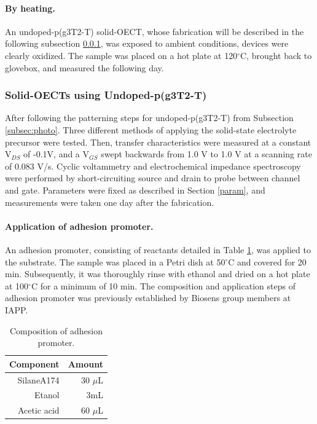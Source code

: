 \paragraph{By heating.}An undoped-p(g3T2-T) solid-OECT, whose fabrication will be described in the following subsection \ref{subsec:solidOECT}, was exposed to ambient conditions, devices were clearly oxidized. The sample was placed on a hot plate at 120$^{\circ}$C, brought back to glovebox, and measured the following day.  %
\subsubsection{Solid-OECTs using Undoped-p(g3T2-T)} \label{subsec:solidOECT}
After following the patterning steps for undoped-p(g3T2-T) from Subsection \ref{subsec:photo}. Three different methods of applying the solid-state electrolyte precursor were tested. Then, transfer characteristics were measured at a constant V$_{DS}$ of -0.1V, and a  V$_{GS}$ swept backwards from 1.0 V to 1.0 V at a scanning rate of 0.083 V/s. Cyclic voltammetry and electrochemical impedance spectroscopy were performed by short-circuiting source and drain to probe between channel and gate. Parameters were fixed as described in Section \ref{param}, and measurements were taken one day after the fabrication.

\paragraph{Application of adhesion promoter.}An adhesion promoter, consisting of reactants detailed in Table \ref{tab:adprom}, was applied to the substrate. The sample was placed in a Petri dish at 50$^{\circ}$C and covered for 20 min. Subsequently, it was thoroughly rinse with ethanol and dried on a hot plate at 100$^{\circ}$C for a minimum of 10 min. The composition and application steps of adhesion promoter was previously established by Biosens group members at IAPP. 

\begin{table}[h]
	\centering
	\caption{Composition of adhesion promoter.}
	\begin{tabular}{r r} \hline
		Component   & Amount \\ \hline
		SilaneA174	& 30 $\mu$L \\ 
		Etanol   & 3mL \\ 
		Acetic acid   & 60 $\mu$L \\ \hline
	\end{tabular}
	\label{tab:adprom}
\end{table}

